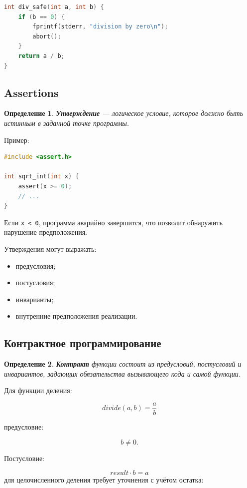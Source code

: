 \documentclass[12pt,a4paper]{article}
\newtheorem{definition}{Определение}
\begin{document}
\begin{lstlisting}[language=C]
int div_safe(int a, int b) {
    if (b == 0) {
        fprintf(stderr, "division by zero\n");
        abort();
    }
    return a / b;
}
\end{lstlisting}

\subsection{Assertions}

\begin{definition}
\textbf{Утверждение} --- логическое условие, которое должно быть истинным в заданной точке программы.
\end{definition}

Пример:

\begin{lstlisting}[language=C]
#include <assert.h>

int sqrt_int(int x) {
    assert(x >= 0);
    // ...
}
\end{lstlisting}

Если \texttt{x < 0}, программа аварийно завершится, что позволит обнаружить нарушение предположения.

Утверждения могут выражать:

\begin{itemize}
  \item предусловия;
  \item постусловия;
  \item инварианты;
  \item внутренние предположения реализации.
\end{itemize}

\subsection{Контрактное программирование}

\begin{definition}
\textbf{Контракт} функции состоит из предусловий, постусловий и инвариантов, задающих обязательства вызывающего кода и самой функции.
\end{definition}

Для функции деления:

\[
divide(a,b)=\frac{a}{b}
\]

предусловие:

\[
b \ne 0.
\]

Постусловие:

\[
result \cdot b = a
\]
для целочисленного деления требует уточнения с учётом остатка:
\end{document}

